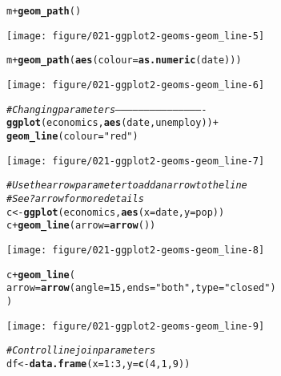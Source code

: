 \documentclass[a4paper,titlepage]{tufte-handout}\usepackage[]{graphicx}\usepackage[]{color}
\makeatletter
\def\maxwidth{ %
  \ifdim\Gin@nat@width>\linewidth
    \linewidth
  \else
    \Gin@nat@width
  \fi
}
\newcommand{\hlnum}[1]{\textcolor[rgb]{0.686,0.059,0.569}{#1}}%
\newcommand{\hlstr}[1]{\textcolor[rgb]{0.192,0.494,0.8}{#1}}%
\newcommand{\hlcom}[1]{\textcolor[rgb]{0.678,0.584,0.686}{\textit{#1}}}%
\newcommand{\hlopt}[1]{\textcolor[rgb]{0,0,0}{#1}}%
\newcommand{\hlstd}[1]{\textcolor[rgb]{0.345,0.345,0.345}{#1}}%
\newcommand{\hlkwb}[1]{\textcolor[rgb]{0.69,0.353,0.396}{#1}}%
\newcommand{\hlkwc}[1]{\textcolor[rgb]{0.333,0.667,0.333}{#1}}%
\newcommand{\hlkwd}[1]{\textcolor[rgb]{0.737,0.353,0.396}{\textbf{#1}}}%
\newenvironment{kframe}{%
 \def\at@end@of@kframe{}%
 \ifinner\ifhmode%
  \def\at@end@of@kframe{\end{minipage}}%
  \begin{minipage}{\columnwidth}%
 \fi\fi%
 \def\FrameCommand##1{\hskip\@totalleftmargin \hskip-\fboxsep
 \colorbox{shadecolor}{##1}\hskip-\fboxsep
     \hskip-\linewidth \hskip-\@totalleftmargin \hskip\columnwidth}%
 \MakeFramed {\advance\hsize-\width
   \@totalleftmargin\z@ \linewidth\hsize
   \@setminipage}}%
 {\par\unskip\endMakeFramed%
 \at@end@of@kframe}
\newenvironment{knitrout}{}{} %
\makeatother
\begin{document}
\begin{knitrout}
\begin{kframe}
\begin{alltt}
\hlstd{m} \hlopt{+} \hlkwd{geom_path}\hlstd{()}
\end{alltt}
\end{kframe}
\texttt{[image: figure/021-ggplot2-geoms-geom\_line-5]} 
\begin{kframe}\begin{alltt}
\hlstd{m} \hlopt{+} \hlkwd{geom_path}\hlstd{(}\hlkwd{aes}\hlstd{(}\hlkwc{colour} \hlstd{=} \hlkwd{as.numeric}\hlstd{(date)))}
\end{alltt}
\end{kframe}
\texttt{[image: figure/021-ggplot2-geoms-geom\_line-6]} 
\begin{kframe}\begin{alltt}
\hlcom{# Changing parameters ----------------------------------------------}
\hlkwd{ggplot}\hlstd{(economics,} \hlkwd{aes}\hlstd{(date, unemploy))} \hlopt{+}
  \hlkwd{geom_line}\hlstd{(}\hlkwc{colour} \hlstd{=} \hlstr{"red"}\hlstd{)}
\end{alltt}
\end{kframe}
\texttt{[image: figure/021-ggplot2-geoms-geom\_line-7]} 
\begin{kframe}\begin{alltt}
\hlcom{# Use the arrow parameter to add an arrow to the line}
\hlcom{# See ?arrow for more details}
\hlstd{c} \hlkwb{<-} \hlkwd{ggplot}\hlstd{(economics,} \hlkwd{aes}\hlstd{(}\hlkwc{x} \hlstd{= date,} \hlkwc{y} \hlstd{= pop))}
\hlstd{c} \hlopt{+} \hlkwd{geom_line}\hlstd{(}\hlkwc{arrow} \hlstd{=} \hlkwd{arrow}\hlstd{())}
\end{alltt}
\end{kframe}
\texttt{[image: figure/021-ggplot2-geoms-geom\_line-8]} 
\begin{kframe}\begin{alltt}
\hlstd{c} \hlopt{+} \hlkwd{geom_line}\hlstd{(}
  \hlkwc{arrow} \hlstd{=} \hlkwd{arrow}\hlstd{(}\hlkwc{angle} \hlstd{=} \hlnum{15}\hlstd{,} \hlkwc{ends} \hlstd{=} \hlstr{"both"}\hlstd{,} \hlkwc{type} \hlstd{=} \hlstr{"closed"}\hlstd{)}
\hlstd{)}
\end{alltt}
\end{kframe}
\texttt{[image: figure/021-ggplot2-geoms-geom\_line-9]} 
\begin{kframe}\begin{alltt}
\hlcom{# Control line join parameters}
\hlstd{df} \hlkwb{<-} \hlkwd{data.frame}\hlstd{(}\hlkwc{x} \hlstd{=} \hlnum{1}\hlopt{:}\hlnum{3}\hlstd{,} \hlkwc{y} \hlstd{=} \hlkwd{c}\hlstd{(}\hlnum{4}\hlstd{,} \hlnum{1}\hlstd{,} \hlnum{9}\hlstd{))}

\end{alltt}
\end{kframe}
\end{knitrout}
\end{document}
